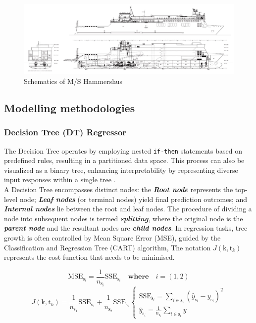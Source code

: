 \documentclass[]{interact}
\theoremstyle{plain}%
\theoremstyle{definition}
\theoremstyle{remark}
\begin{document}
\begin{figure}[h]
  \centering
      \includegraphics[width=.75\textwidth]{00_figures/Hammershus_Pict.jpg}
      \caption{Schematics of M/S Hammershus}
      \label{fig:Hammershus_Pict}
\end{figure}

\subsection{Modelling methodologies}\label{sec:tree_model_development}

\subsubsection{Decision Tree (DT) Regressor}\label{sec:dt_theo_j}

The Decision Tree operates by employing nested {\tt if-then} statements based on predefined rules, resulting in a partitioned data space. This process can also be visualized as a binary tree, enhancing interpretability by representing diverse input responses within a single tree \citet{Kuhn.2013, Hastie.2009}.\\

A Decision Tree encompasses distinct nodes: the \textbf{\emph{Root node}} represents the top-level node; \textbf{\emph{Leaf nodes}} (or terminal nodes) yield final prediction outcomes; and \textbf{\emph{Internal nodes}} lie between the root and leaf nodes. The procedure of dividing a node into subsequent nodes is termed \textbf{\emph{splitting}}, where the original node is the \textbf{\emph{parent node}} and the resultant nodes are \textbf{\emph{child nodes}}. In regression tasks, tree growth is often controlled by Mean Square Error (MSE), guided by the Classification and Regression Tree (CART) algorithm, The notation $J(\text{k},\text{t}_k)$ represents the cost function that needs to be minimised.

\begin{equation}\label{eqn:sse}
  \text{MSE}_{\text{s}_i} = \frac{1}{n_{\text{s}_i}}\text{SSE}_{\text{s}_i} \quad \textbf{where} \quad i = (1,2)   
\end{equation}
\begin{equation}\label{eqn:costfun}
  J(\text{k},\text{t}_k) = \frac{1}{n_{\text{s}_1}}\text{SSE}_{\text{s}_1} + \frac{1}{n_{\text{s}_2}}\text{SSE}_{\text{s}_2}
  \begin{cases}
      \text{SSE}_{\text{s}_i} = \sum\limits_{i \in \text{s}_i}(\hat{y}_{\text{s}_i} - y_{\text{s}_i} )^2 \\
      \hat{y}_{\text{s}_i} = \frac{1}{n_{\text{s}_i}}\sum\limits_{i\in \text{s}_i} y
  \end{cases}  
\end{equation}
\end{document}
